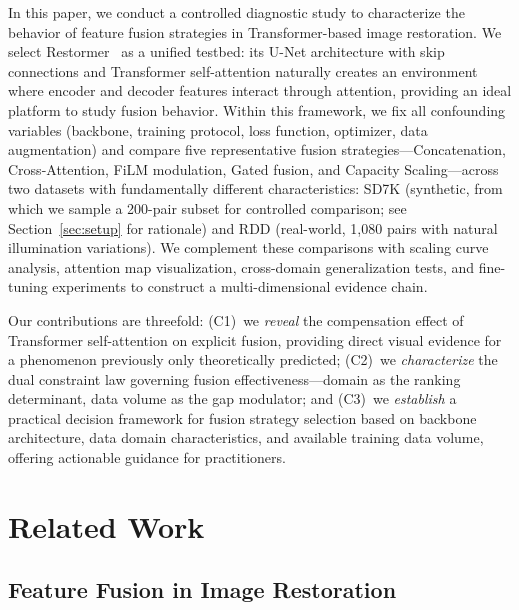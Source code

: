 \documentclass[pdflatex,sn-basic,Numbered]{sn-jnl}
\theoremstyle{thmstyleone}
\theoremstyle{thmstyletwo}
\theoremstyle{thmstylethree}
\begin{document}
In this paper, we conduct a controlled diagnostic study to characterize the behavior of feature fusion strategies in Transformer-based image restoration.
We select Restormer~\cite{zamir2022restormer} as a unified testbed: its U-Net architecture with skip connections and Transformer self-attention naturally creates an environment where encoder and decoder features interact through attention, providing an ideal platform to study fusion behavior.
Within this framework, we fix all confounding variables (backbone, training protocol, loss function, optimizer, data augmentation) and compare five representative fusion strategies---Concatenation, Cross-Attention, FiLM modulation, Gated fusion, and Capacity Scaling---across two datasets with fundamentally different characteristics: SD7K (synthetic, from which we sample a 200-pair subset for controlled comparison; see Section~\ref{sec:setup} for rationale) and RDD (real-world, 1,080 pairs with natural illumination variations).
We complement these comparisons with scaling curve analysis, attention map visualization, cross-domain generalization tests, and fine-tuning experiments to construct a multi-dimensional evidence chain.

Our contributions are threefold: (C1)~we \textit{reveal} the compensation effect of Transformer self-attention on explicit fusion, providing direct visual evidence for a phenomenon previously only theoretically predicted; (C2)~we \textit{characterize} the dual constraint law governing fusion effectiveness---domain as the ranking determinant, data volume as the gap modulator; and (C3)~we \textit{establish} a practical decision framework for fusion strategy selection based on backbone architecture, data domain characteristics, and available training data volume, offering actionable guidance for practitioners.

\section{Related Work}\label{sec:related}

\subsection{Feature Fusion in Image Restoration}
\end{document}

